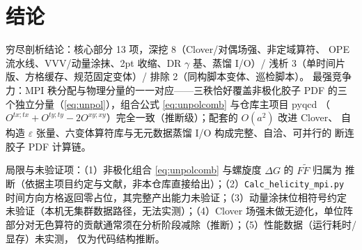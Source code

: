 \documentclass[UTF8]{ctexart}
\begin{document}
\section{结论}
\begin{conclbox}
穷尽剖析结论：核心部分 13 项，\textcolor{algo}{深挖 8}（Clover/对偶场强、非定域算符、
OPE 流水线、VVV/动量涂抹、2pt 收缩、DR $\gamma$ 基、蒸馏 I/O）/
\textcolor{map}{浅析 3}（单时间片版、方格缓存、规范固定变体）/
\textcolor{warn}{排除 2}（同构脚本变体、巡检脚本）。
最强竞争力：\textcolor{phys}{MPI 秩分配与物理分量的一一对应}——三秩恰好覆盖非极化胶子 PDF
的三个独立分量（\eqref{eq:unpol}），组合公式 \eqref{eq:unpolcomb} 与仓库主项目 pyqcd
（$O^{tx;tx}+O^{ty;ty}-2O^{xy;xy}$）完全一致（推断级）；配套的 $O(a^2)$ 改进 Clover、
自构造 $\varepsilon$ 张量、六变体算符库与无元数据蒸馏 I/O 构成完整、自洽、可并行的
断连胶子 PDF 计算链。
\end{conclbox}
\begin{warnbox}
局限与未验证项：（1）非极化组合 \eqref{eq:unpolcomb} 与螺旋度 $\Delta G$ 的 $F\widetilde F$ 归属为
\textcolor{warn}{推断}（依据主项目约定与文献，非本仓库直接给出）；（2）\texttt{Calc\_helicity\_mpi.py}
时间方向方格返回零占位，其完整产出能力\textcolor{warn}{未验证}；（3）动量涂抹位相符号约定
\textcolor{warn}{未验证}（本机无集群数据路径，无法实测）；（4）Clover 场强未做无迹化，单位阵
部分对无色算符的贡献通常须在分析阶段减除（推断）；（5）性能数据（运行耗时/显存）未实测，
仅为代码结构推断。
\end{warnbox}
\end{document}

